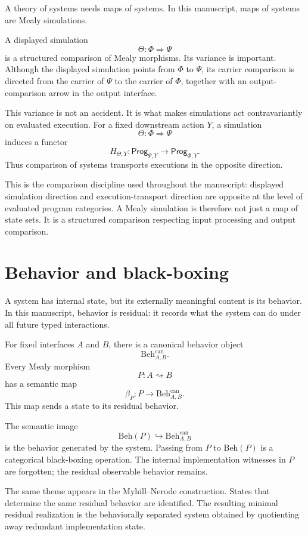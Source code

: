 A theory of systems needs maps of systems.  In this manuscript, maps of
systems are Mealy simulations.

A displayed simulation
\[
  \Theta:\Phi\Rightarrow\Psi
\]
is a structured comparison of Mealy morphisms.  Its variance is important.
Although the displayed simulation points from \(\Phi\) to \(\Psi\), its
carrier comparison is directed from the carrier of \(\Psi\) to the carrier of
\(\Phi\), together with an output-comparison arrow in the output interface.

This variance is not an accident.  It is what makes simulations act
contravariantly on evaluated execution.  For a fixed downstream action \(Y\),
a simulation
\[
  \Theta:\Phi\Rightarrow\Psi
\]
induces a functor
\[
  H_{\Theta,Y}:
  \mathsf{Prog}_{\Psi,Y}
  \longrightarrow
  \mathsf{Prog}_{\Phi,Y}.
\]
Thus comparison of systems transports executions in the opposite direction.

This is the comparison discipline used throughout the manuscript: displayed
simulation direction and execution-transport direction are opposite at the
level of evaluated program categories.  A Mealy simulation is therefore not
just a map of state sets.  It is a structured comparison respecting input
processing and output comparison.

\section{Behavior and black-boxing}
\label{sec:behavior-and-black-boxing}

A system has internal state, but its externally meaningful content is its
behavior.  In this manuscript, behavior is residual: it records what the
system can do under all future typed interactions.

For fixed interfaces \(A\) and \(B\), there is a canonical behavior object
\[
  \mathrm{Beh}^{\mathrm{can}}_{A,B}.
\]
Every Mealy morphism
\[
  P:A\rightsquigarrow B
\]
has a semantic map
\[
  \beta_P:P\longrightarrow \mathrm{Beh}^{\mathrm{can}}_{A,B}.
\]
This map sends a state to its residual behavior.

The semantic image
\[
  \mathrm{Beh}(P)\hookrightarrow \mathrm{Beh}^{\mathrm{can}}_{A,B}
\]
is the behavior generated by the system.  Passing from \(P\) to
\(\mathrm{Beh}(P)\) is a categorical black-boxing operation.  The internal
implementation witnesses in \(P\) are forgotten; the residual observable
behavior remains.

The same theme appears in the Myhill--Nerode construction.  States that
determine the same residual behavior are identified.  The resulting minimal
residual realization is the behaviorally separated system obtained by
quotienting away redundant implementation state.

